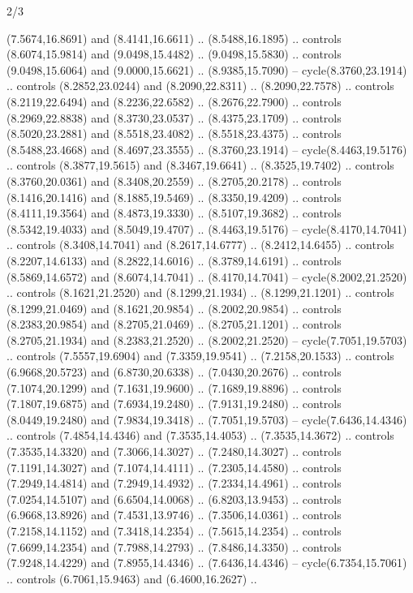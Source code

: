 \begin{flagdescription}{2/3}
\begin{scope}[yshift=\flagwidth,scale=\flagwidth/1241.93737]
\begin{scope}[y=-1mm, x=1mm,draw=gold,fill=blue,line join=miter,miter limit=4,line width=1.8\lw]
{  (7.5674,16.8691) and (8.4141,16.6611) .. (8.5488,16.1895) .. controls
  (8.6074,15.9814) and (9.0498,15.4482) .. (9.0498,15.5830) .. controls
  (9.0498,15.6064) and (9.0000,15.6621) .. (8.9385,15.7090) --
  cycle(8.3760,23.1914) .. controls (8.2852,23.0244) and (8.2090,22.8311) ..
  (8.2090,22.7578) .. controls (8.2119,22.6494) and (8.2236,22.6582) ..
  (8.2676,22.7900) .. controls (8.2969,22.8838) and (8.3730,23.0537) ..
  (8.4375,23.1709) .. controls (8.5020,23.2881) and (8.5518,23.4082) ..
  (8.5518,23.4375) .. controls (8.5488,23.4668) and (8.4697,23.3555) ..
  (8.3760,23.1914) -- cycle(8.4463,19.5176) .. controls (8.3877,19.5615) and
  (8.3467,19.6641) .. (8.3525,19.7402) .. controls (8.3760,20.0361) and
  (8.3408,20.2559) .. (8.2705,20.2178) .. controls (8.1416,20.1416) and
  (8.1885,19.5469) .. (8.3350,19.4209) .. controls (8.4111,19.3564) and
  (8.4873,19.3330) .. (8.5107,19.3682) .. controls (8.5342,19.4033) and
  (8.5049,19.4707) .. (8.4463,19.5176) -- cycle(8.4170,14.7041) .. controls
  (8.3408,14.7041) and (8.2617,14.6777) .. (8.2412,14.6455) .. controls
  (8.2207,14.6133) and (8.2822,14.6016) .. (8.3789,14.6191) .. controls
  (8.5869,14.6572) and (8.6074,14.7041) .. (8.4170,14.7041) --
  cycle(8.2002,21.2520) .. controls (8.1621,21.2520) and (8.1299,21.1934) ..
  (8.1299,21.1201) .. controls (8.1299,21.0469) and (8.1621,20.9854) ..
  (8.2002,20.9854) .. controls (8.2383,20.9854) and (8.2705,21.0469) ..
  (8.2705,21.1201) .. controls (8.2705,21.1934) and (8.2383,21.2520) ..
  (8.2002,21.2520) -- cycle(7.7051,19.5703) .. controls (7.5557,19.6904) and
  (7.3359,19.9541) .. (7.2158,20.1533) .. controls (6.9668,20.5723) and
  (6.8730,20.6338) .. (7.0430,20.2676) .. controls (7.1074,20.1299) and
  (7.1631,19.9600) .. (7.1689,19.8896) .. controls (7.1807,19.6875) and
  (7.6934,19.2480) .. (7.9131,19.2480) .. controls (8.0449,19.2480) and
  (7.9834,19.3418) .. (7.7051,19.5703) -- cycle(7.6436,14.4346) .. controls
  (7.4854,14.4346) and (7.3535,14.4053) .. (7.3535,14.3672) .. controls
  (7.3535,14.3320) and (7.3066,14.3027) .. (7.2480,14.3027) .. controls
  (7.1191,14.3027) and (7.1074,14.4111) .. (7.2305,14.4580) .. controls
  (7.2949,14.4814) and (7.2949,14.4932) .. (7.2334,14.4961) .. controls
  (7.0254,14.5107) and (6.6504,14.0068) .. (6.8203,13.9453) .. controls
  (6.9668,13.8926) and (7.4531,13.9746) .. (7.3506,14.0361) .. controls
  (7.2158,14.1152) and (7.3418,14.2354) .. (7.5615,14.2354) .. controls
  (7.6699,14.2354) and (7.7988,14.2793) .. (7.8486,14.3350) .. controls
  (7.9248,14.4229) and (7.8955,14.4346) .. (7.6436,14.4346) --
  cycle(6.7354,15.7061) .. controls (6.7061,15.9463) and (6.4600,16.2627) ..
}
\end{scope}
\end{scope}
\end{flagdescription}
